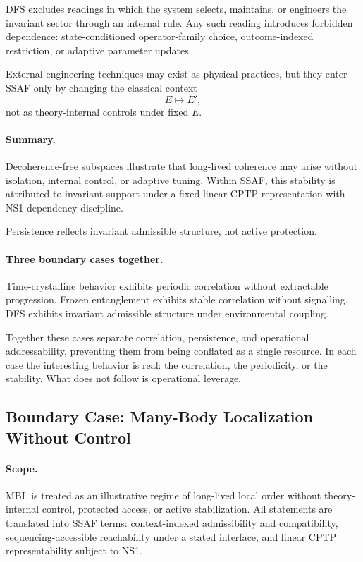 \documentclass[aps,prx,onecolumn,11pt]{revtex4-2}
\theoremstyle{plain}
\theoremstyle{definition}
\theoremstyle{remark}
\begin{document}
DFS excludes readings in which the system selects, maintains, or
engineers the invariant sector through an internal rule. Any such
reading introduces forbidden dependence: state-conditioned
operator-family choice, outcome-indexed restriction, or adaptive
parameter updates.

External engineering techniques may exist as physical practices, but
they enter SSAF only by changing the classical context
\[
E\longmapsto E',
\]
not as theory-internal controls under fixed \(E\).

\paragraph{Summary.}

Decoherence-free subspaces illustrate that long-lived coherence may
arise without isolation, internal control, or adaptive tuning. Within
SSAF, this stability is attributed to invariant support under a fixed
linear CPTP representation with NS1 dependency discipline.

Persistence reflects invariant admissible structure, not active
protection.

\paragraph{Three boundary cases together.}

Time-crystalline behavior exhibits periodic correlation without
extractable progression. Frozen entanglement exhibits stable
correlation without signalling. DFS exhibits invariant admissible
structure under environmental coupling.

Together these cases separate correlation, persistence, and operational
addressability, preventing them from being conflated as a single
resource. In each case the interesting behavior is real: the
correlation, the periodicity, or the stability. What does not follow is
operational leverage.

\subsection{Boundary Case: Many-Body Localization Without Control}
\label{subsec:mbl_boundary}

\paragraph{Scope.}

MBL is treated as an illustrative regime of long-lived local order
without theory-internal control, protected access, or active
stabilization. All statements are translated into SSAF terms:
context-indexed admissibility and compatibility,
sequencing-accessible reachability under a stated interface, and
linear CPTP representability subject to NS1.
\end{document}
